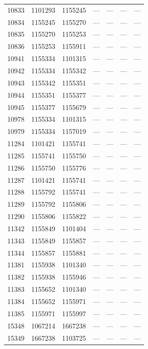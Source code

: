 \begin{longtable}{lcccccc}
10833 & 1101293 & 1155245 & --- & --- & --- & --- \\
10834 & 1155245 & 1155270 & --- & --- & --- & --- \\
10835 & 1155270 & 1155253 & --- & --- & --- & --- \\
10836 & 1155253 & 1155911 & --- & --- & --- & --- \\
10941 & 1155334 & 1101315 & --- & --- & --- & --- \\
10942 & 1155334 & 1155342 & --- & --- & --- & --- \\
10943 & 1155342 & 1155351 & --- & --- & --- & --- \\
10944 & 1155351 & 1155377 & --- & --- & --- & --- \\
10945 & 1155377 & 1155679 & --- & --- & --- & --- \\
10978 & 1155334 & 1101315 & --- & --- & --- & --- \\
10979 & 1155334 & 1157019 & --- & --- & --- & --- \\
11284 & 1101421 & 1155741 & --- & --- & --- & --- \\
11285 & 1155741 & 1155750 & --- & --- & --- & --- \\
11286 & 1155750 & 1155776 & --- & --- & --- & --- \\
11287 & 1101421 & 1155741 & --- & --- & --- & --- \\
11288 & 1155792 & 1155741 & --- & --- & --- & --- \\
11289 & 1155792 & 1155806 & --- & --- & --- & --- \\
11290 & 1155806 & 1155822 & --- & --- & --- & --- \\
11342 & 1155849 & 1101404 & --- & --- & --- & --- \\
11343 & 1155849 & 1155857 & --- & --- & --- & --- \\
11344 & 1155857 & 1155881 & --- & --- & --- & --- \\
11381 & 1155938 & 1101340 & --- & --- & --- & --- \\
11382 & 1155938 & 1155946 & --- & --- & --- & --- \\
11383 & 1155652 & 1101340 & --- & --- & --- & --- \\
11384 & 1155652 & 1155971 & --- & --- & --- & --- \\
11385 & 1155971 & 1155997 & --- & --- & --- & --- \\
15348 & 1067214 & 1667238 & --- & --- & --- & --- \\
15349 & 1667238 & 1103725 & --- & --- & --- & --- \\

\end{longtable}
